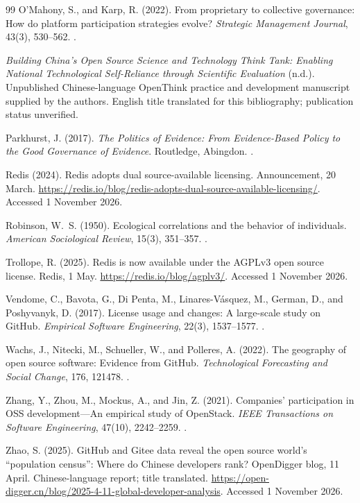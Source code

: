\begin{thebibliography}{99}
O'Mahony, S., and Karp, R. (2022).
From proprietary to collective governance: How do platform participation strategies evolve?
\emph{Strategic Management Journal}, 43(3), 530--562.
.

\emph{Building China's Open Source Science and Technology Think Tank: Enabling National Technological Self-Reliance through Scientific Evaluation} (n.d.).
Unpublished Chinese-language OpenThink practice and development manuscript supplied by the authors. English title translated for this bibliography; publication status unverified.

Parkhurst, J. (2017).
\emph{The Politics of Evidence: From Evidence-Based Policy to the Good Governance of Evidence}.
Routledge, Abingdon.
.

Redis (2024).
Redis adopts dual source-available licensing.
Announcement, 20 March.
\url{https://redis.io/blog/redis-adopts-dual-source-available-licensing/}.
Accessed 1 November 2026.

Robinson, W.~S. (1950).
Ecological correlations and the behavior of individuals.
\emph{American Sociological Review}, 15(3), 351--357.
.

Trollope, R. (2025).
Redis is now available under the AGPLv3 open source license.
Redis, 1 May.
\url{https://redis.io/blog/agplv3/}.
Accessed 1 November 2026.

Vendome, C., Bavota, G., Di Penta, M., Linares-Vásquez, M., German, D., and Poshyvanyk, D. (2017).
License usage and changes: A large-scale study on GitHub.
\emph{Empirical Software Engineering}, 22(3), 1537--1577.
.

Wachs, J., Nitecki, M., Schueller, W., and Polleres, A. (2022).
The geography of open source software: Evidence from GitHub.
\emph{Technological Forecasting and Social Change}, 176, 121478.
.

Zhang, Y., Zhou, M., Mockus, A., and Jin, Z. (2021).
Companies' participation in OSS development---An empirical study of OpenStack.
\emph{IEEE Transactions on Software Engineering}, 47(10), 2242--2259.
.

Zhao, S. (2025).
GitHub and Gitee data reveal the open source world's ``population census'': Where do Chinese developers rank?
OpenDigger blog, 11 April. Chinese-language report; title translated.
\url{https://open-digger.cn/blog/2025-4-11-global-developer-analysis}.
Accessed 1 November 2026.

\end{thebibliography}
\endgroup
